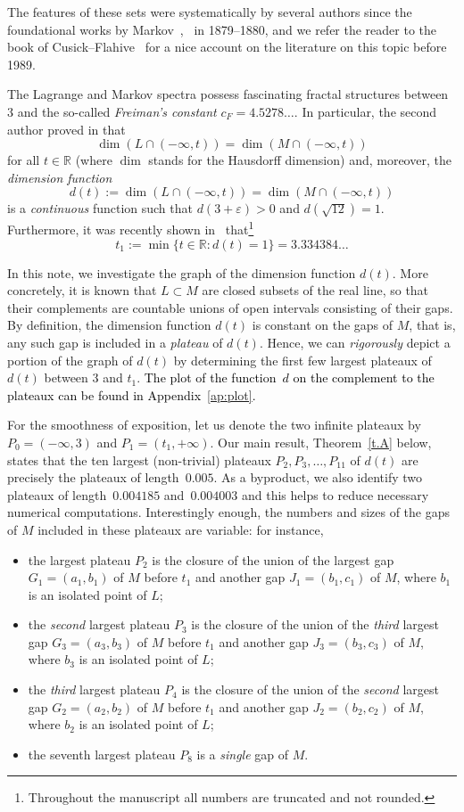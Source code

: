 \documentclass[10pt]{amsart}
\numberwithin{equation}{section}
\theoremstyle{definition}
\newcommand\pvshort[1]{\textcolor{black}{#1} }
\begin{document}
The features of these sets were systematically by several authors since the
foundational works by Markov~\cite{Mar79},~\cite{Mar80} in 1879--1880, and we
refer the reader to the book of Cusick--Flahive~\cite{CF} for a nice account on the literature on this topic before 1989. 

The Lagrange and Markov spectra possess fascinating fractal structures between $3$ and the so-called \emph{Freiman's constant} $c_F=4.5278\dots$. In particular, the second author proved in \cite{Mor18} that 
$$\dim(L\cap(-\infty,t)) = \dim(M\cap(-\infty,t))$$ 
for all $t\in\mathbb{R}$ (where $\dim$ stands for the Hausdorff dimension) and, moreover, the \emph{dimension function} 
$$d(t):=\dim(L\cap(-\infty,t)) = \dim(M\cap(-\infty,t))$$ 
is a \emph{continuous} function such that $d(3+\varepsilon)>0$ and
$d(\sqrt{12})=1$. Furthermore, it was recently shown in~\cite{MMPV}
that\footnote{Throughout the manuscript all numbers are truncated and not rounded.} 
$$t_1:=\min\{t\in\mathbb{R}: d(t)=1\}=3.334384\dots$$ 

In this note, we investigate the graph of the dimension function $d(t)$. More
concretely, it is known that $L\subset M$ are closed subsets of the real line,
so that their complements are countable unions of open intervals consisting of
their gaps. By definition, the dimension function $d(t)$ is constant on the gaps
of $M$, that is, any such gap is included in a \emph{plateau} of $d(t)$. Hence,
we can \emph{rigorously} depict a portion of the graph of $d(t)$ by determining
the first few largest plateaux of $d(t)$ between $3$ and $t_1$.
\pvshort{The plot of the function~$d$ on the complement to the plateaux can be found in
Appendix~\ref{ap:plot}. }

For the smoothness of exposition, let us denote the two infinite
plateaux by $P_0 = (-\infty,3)$ and $P_1 = (t_1, + \infty)$. 
Our main result, Theorem~\ref{t.A} below, states that the ten largest (non-trivial)
plateaux $P_2, P_3,\dots, P_{11}$ of $d(t)$ are precisely the plateaux of
length~$0.005$. As a byproduct, we also identify two plateaux of
length~$0.004185$ and~$0.004003$ and this helps to reduce necessary numerical
computations. Interestingly enough, the numbers and sizes of the gaps of $M$ included in these plateaux are variable: for
instance,  
\begin{itemize} 
    \item the largest plateau $P_2$ is the closure of the union of the largest gap $G_1=(a_1,b_1)$ of $M$ before $t_1$ and another gap $J_1=(b_1,c_1)$ of $M$, where $b_1$ is an isolated point of $L$; 
    \item the \emph{second} largest plateau $P_3$ is the closure of the union of the \emph{third} largest gap $G_3=(a_3,b_3)$ of $M$ before $t_1$ and another gap $J_3=(b_3,c_3)$ of $M$, where $b_3$ is an isolated point of $L$; 
    \item the \emph{third} largest plateau $P_4$ is the closure of the union of the \emph{second} largest gap $G_2=(a_2,b_2)$ of $M$ before $t_1$ and another gap $J_2=(b_2,c_2)$ of $M$, where $b_2$ is an isolated point of $L$; 
    \item the seventh largest plateau $P_8$ is a \emph{single} gap of $M$. 
\end{itemize} 
\end{document}

